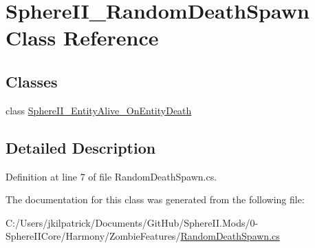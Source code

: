 \hypertarget{class_sphere_i_i___random_death_spawn}{}\section{Sphere\+I\+I\+\_\+\+Random\+Death\+Spawn Class Reference}
\label{class_sphere_i_i___random_death_spawn}
\subsection*{Classes}
\begin{DoxyCompactItemize}
\item 
class \mbox{\hyperlink{class_sphere_i_i___random_death_spawn_1_1_sphere_i_i___entity_alive___on_entity_death}{Sphere\+I\+I\+\_\+\+Entity\+Alive\+\_\+\+On\+Entity\+Death}}
\end{DoxyCompactItemize}


\subsection{Detailed Description}


Definition at line 7 of file Random\+Death\+Spawn.\+cs.



The documentation for this class was generated from the following file\+:\begin{DoxyCompactItemize}
\item 
C\+:/\+Users/jkilpatrick/\+Documents/\+Git\+Hub/\+Sphere\+I\+I.\+Mods/0-\/\+Sphere\+I\+I\+Core/\+Harmony/\+Zombie\+Features/\mbox{\hyperlink{_random_death_spawn_8cs}{Random\+Death\+Spawn.\+cs}}\end{DoxyCompactItemize}

